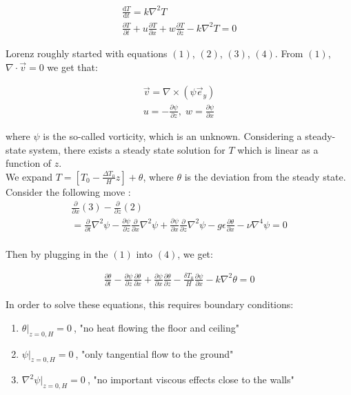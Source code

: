 \begin{align*}
    \frac{\mathrm{d}T }{\mathrm{d} t} = k \nabla^2 T  \\
    \frac{\partial T }{\partial t} + u \frac{\partial T }{\partial x} + w \frac{\partial T }{\partial z} - k \nabla^2 T  = 0 \tag{4}
\end{align*}

Lorenz roughly started with equations $(1)$, $(2)$, $(3)$, $(4)$. From $(1)$, $\nabla\cdot \vec{v} = 0$ we get that:

\begin{align*}
    \vec{v} = \nabla \times(\psi \vec{e}_y)\\
    u = -\frac{\partial \psi}{\partial z},\;
    w = \frac{\partial \psi}{\partial x}
\end{align*}

where $\psi$ is the so-called vorticity, which is an unknown. Considering a steady-state system, there exists a steady state solution for $T$ which is linear as a function of $z$. \\

We expand $T = \left[ T_0 - \frac{\Delta T_0}{H} z \right] + \theta$, where $\theta$ is the deviation from the steady state. Consider the following move : 
\begin{align*}
    \frac{\partial}{\partial x} (3) - \frac{\partial}{\partial z} (2) \\
    = \frac{\partial}{\partial t} \nabla^2 \psi - \frac{\partial \psi}{\partial z} \frac{\partial}{\partial x} \nabla^2 \psi + \frac{\partial \psi}{\partial x} \frac{\partial}{\partial z} \nabla^2 \psi - g \epsilon \frac{\partial \theta}{\partial x} - \nu \nabla^4 \psi = 0\\
\end{align*}

Then by plugging in the $(1)$ into $(4)$, we get:

\begin{align*}
    \frac{\partial \theta}{\partial t} - \frac{\partial \psi}{\partial z} \frac{\partial \theta}{\partial x} + \frac{\partial \psi}{\partial x} \frac{\partial \theta}{\partial z} -  \frac{\delta T_0}{H} \frac{\partial \psi}{\partial x} - k \nabla^2 \theta = 0
\end{align*}

In order to solve these equations, this requires boundary conditions:

\begin{enumerate}
    \item $\theta|_{z = 0,H} = 0~$, "no heat flowing the floor and ceiling"
    \item $\psi|_{z = 0,H} = 0~$, "only tangential flow to the ground"
    \item $\nabla^2 \psi|_{z = 0,H} = 0~$, "no important viscous effects close to the walls"
\end{enumerate}

